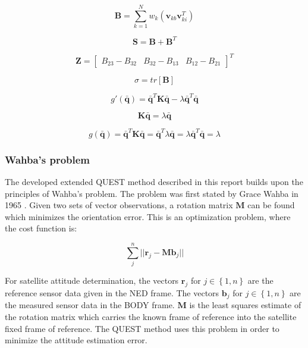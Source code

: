 \documentclass[12pt,a4paper,oneside]{article}
\begin{document}
\begin{equation}
\bm{B} = \sum_{k=1}^Nw_k(\bm{v}_{kb}\bm{v}_{ki}^T)
\end{equation}

\begin{equation}
\bm{S} = \bm{B} + \bm{B}^T
\end{equation}

\begin{equation}
\bm{Z} = \begin{bmatrix}
B_{23} - B_{32} & B_{32} - B_{13} & B_{12} - B_{21}
\end{bmatrix} ^T
\end{equation}

\begin{equation}
\sigma = tr[\bm{B}]
\end{equation}

\begin{equation}
g'(\bm{\bar{q}}) = \bm{\bar{q}}^T\bm{K}\bm{\bar{q}} - \lambda\bm{\bar{q}}^T\bm{\bar{q}}
\end{equation}

\begin{equation}
\bm{K}\bm{\bar{q}} = \lambda\bm{\bar{q}}
\end{equation}

\begin{equation}
g(\bm{\bar{q}}) = \bm{\bar{q}}^T\bm{K}\bm{\bar{q}} = \bm{\bar{q}}^T\lambda\bm{\bar{q}} = \lambda\bm{\bar{q}}^T\bm{\bar{q}} = \lambda
\end{equation}

\subsubsection{Wahba's problem}

The developed extended QUEST method described in this report builds upon the principles
of Wahba’s problem. The problem was first stated by Grace Wahba in 1965 \citet{wahba1965least}. Given
two sets of vector observations, a rotation matrix $\bm{M}$ can be found which minimizes the
orientation error. This is an optimization problem, where the cost function is:

\begin{equation}
\sum_j^n ||\bm{r}_j - \bm{Mb}_j||
\end{equation}

For satellite attitude determination, the vectors $\bm{r}_j$ for $j \in \left\{1, n\right\}$ are the reference sensor data given in the NED frame. The vectors $\bm{b}_j$ for $j \in \left\{1, n\right\}$  are the measured sensor data in the BODY frame. $\bm{M}$ is the least squares estimate of the rotation matrix which carries the known frame of reference into the satellite fixed frame of reference.
The QUEST method uses this problem in order to minimize the attitude estimation error.
\end{document}
